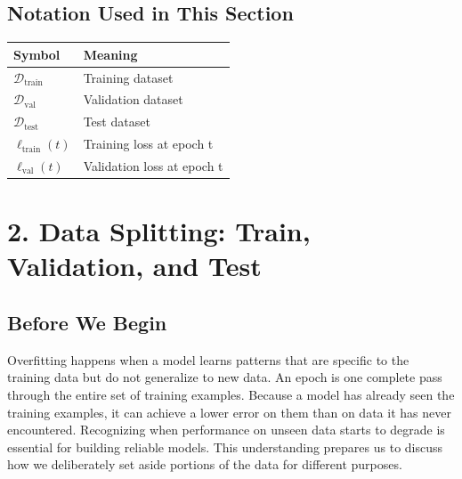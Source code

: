 \documentclass[12pt, a4paper]{article}
\begin{document}
\newpage

\subsection*{Notation Used in This Section}
\begin{tabular}{@{}ll@{}}
\toprule
Symbol & Meaning \\ \midrule
    $\mathcal{D}_{\text{train}}$ & Training dataset \\
    $\mathcal{D}_{\text{val}}$ & Validation dataset \\
    $\mathcal{D}_{\text{test}}$ & Test dataset \\
    $\ell_{\text{train}}(t)$ & Training loss at epoch t \\
    $\ell_{\text{val}}(t)$ & Validation loss at epoch t \\
\bottomrule
\end{tabular}
\vspace{1em}

\section{2. Data Splitting: Train, Validation, and Test}

\subsection{Before We Begin}
Overfitting happens when a model learns patterns that are specific to the training data but do not generalize to new data. An epoch is one complete pass through the entire set of training examples. Because a model has already seen the training examples, it can achieve a lower error on them than on data it has never encountered. Recognizing when performance on unseen data starts to degrade is essential for building reliable models. This understanding prepares us to discuss how we deliberately set aside portions of the data for different purposes.
\end{document}
